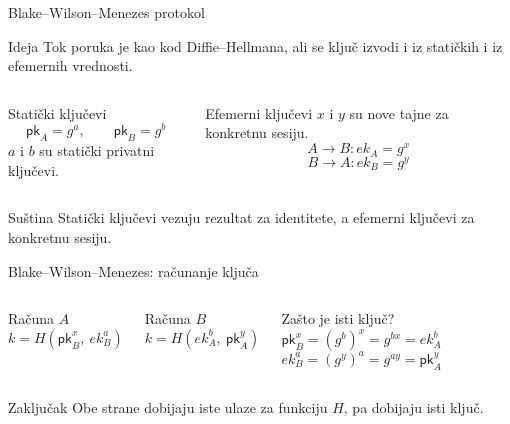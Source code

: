 \documentclass[aspectratio=1610]{beamer}
\newcommand{\pk}{\mathsf{pk}}
\begin{document}
\begin{frame}[t]{Blake--Wilson--Menezes protokol}
\small
\begin{block}{Ideja}
Tok poruka je kao kod Diffie--Hellmana, ali se ključ izvodi i iz statičkih i iz efemernih vrednosti.
\end{block}

\begin{columns}[T,onlytextwidth]
\begin{block}{Statički ključevi}
\[
\pk_A=g^a,\qquad \pk_B=g^b
\]
$a$ i $b$ su statički privatni ključevi.
\end{block}

\begin{block}{Efemerni ključevi}
$x$ i $y$ su nove tajne za konkretnu sesiju.
\[
A\rightarrow B: ek_A=g^x
\]
\[
B\rightarrow A: ek_B=g^y
\]
\end{block}
\end{columns}

\vspace{0.3em}
\begin{alertblock}{Suština}
Statički ključevi vezuju rezultat za identitete, a efemerni ključevi za konkretnu sesiju.
\end{alertblock}
\end{frame}

\begin{frame}[t]{Blake--Wilson--Menezes: računanje ključa}
\small
\begin{columns}[T,onlytextwidth]
\begin{block}{Računa $A$}
\[
k=H(\pk_B^x,\ ek_B^a)
\]
\end{block}

\begin{block}{Računa $B$}
\[
k=H(ek_A^b,\ \pk_A^y)
\]
\end{block}

\begin{block}{Zašto je isti ključ?}
\[
\pk_B^x=(g^b)^x=g^{bx}=ek_A^b
\]
\[
ek_B^a=(g^y)^a=g^{ay}=\pk_A^y
\]
\end{block}
\end{columns}

\vspace{0.3em}
\begin{alertblock}{Zaključak}
Obe strane dobijaju iste ulaze za funkciju $H$, pa dobijaju isti ključ.
\end{alertblock}
\end{frame}
\end{document}
